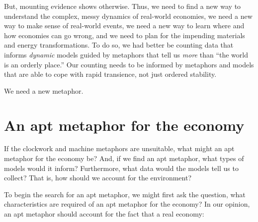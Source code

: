 But, mounting evidence shows otherwise. 
Thus, we need to find a new way to understand the complex, 
messy dynamics of real-world economies,
we need a new way to make sense of real-world events, 
we need a new way to learn where and how economies can go wrong, and
we need to plan for the impending materials and energy transformations.
To do so, we had better be counting data that informs \emph{dynamic} models
guided by metaphors that tell us \emph{more} than ``the world is an orderly place.''
Our counting needs to be informed by metaphors and models that are
able to cope with rapid transience,
not just ordered stability.

We need a new metaphor.



\section{An apt metaphor for the economy}
\label{sec:apt_metaphor}

If the clockwork and machine metaphors are unsuitable, 
what might an apt metaphor for the economy be?
And, if we find an apt metaphor, what types of models would it inform?
Furthermore, what data would the models tell us to collect?
That is, how should we account for the environment?

To begin the search for an apt metaphor, 
we might first ask the question, 
what characteristics are required of an apt metaphor for the economy?
In our opinion, an apt metaphor should account for the fact 
that a real economy:


